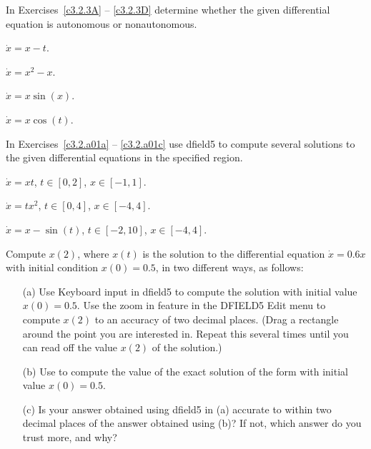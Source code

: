 \noindent In Exercises~\ref{c3.2.3A} -- \ref{c3.2.3D} determine whether the 
given differential equation is autonomous or nonautonomous.
\begin{exercise} \label{c3.2.3A}
$\dot{x}=x-t$.
\end{exercise}
\begin{exercise} \label{c3.2.3B}
$\dot{x}=x^2-x$.
\end{exercise}
\begin{exercise} \label{c3.2.3C}
$\dot{x}=x\sin(x)$.
\end{exercise}
\begin{exercise} \label{c3.2.3D}
$\dot{x}=x\cos(t)$.
\end{exercise}


\CEXER

\noindent In Exercises~\ref{c3.2.a01a} -- \ref{c3.2.a01c} use
{\sf dfield5} to compute several solutions to the given differential
equations in the specified region.
\begin{exercise} \label{c3.2.a01a}
$\dot{x} = xt$, $t\in[0,2]$, $x\in[-1,1]$.
\end{exercise}
\begin{exercise} \label{c3.2.a01b}
$\dot{x} = tx^2$, $t\in[0,4]$, $x\in[-4,4]$.
\end{exercise}
\begin{exercise} \label{c3.2.a01c}
$\dot{x} = x-\sin(t)$, $t\in[-2,10]$, $x\in[-4,4]$.
\end{exercise}

\begin{exercise} \label{c3.2.1*}
Compute $x(2)$, where $x(t)$ is the solution to the differential equation 
$\dot{x} = 0.6x$ with initial condition $x(0)=0.5$, in two different ways, 
as follows:
\begin{itemize}
\item[(a)] Use {\sf Keyboard input} in {\sf dfield5} to compute the 
solution with initial value $x(0)=0.5$.  Use the {\sf zoom in} feature in 
the {\sf DFIELD5 Edit} menu to compute $x(2)$ to an accuracy of two decimal 
places.  (Drag a rectangle around the point you are interested in.  Repeat 
this several times until you can read off the value $x(2)$ of the solution.)  
\item[(b)] Use \Matlab to compute the value of the exact solution
of the form  with initial value $x(0)=0.5$.  
\item[(c)] Is your answer obtained using {\sf dfield5} in (a) accurate to 
within two decimal places of the answer obtained using (b)?  If not, 
which answer do you trust more, and why?
\end{itemize}
\end{exercise}

